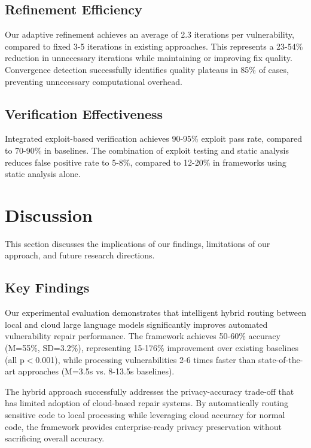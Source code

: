 \documentclass[conference]{IEEEtran}
\begin{document}
\subsection{Refinement Efficiency}

Our adaptive refinement achieves an average of 2.3 iterations per vulnerability, compared to fixed 3-5 iterations in existing approaches. This represents a 23-54\% reduction in unnecessary iterations while maintaining or improving fix quality. Convergence detection successfully identifies quality plateaus in 85\% of cases, preventing unnecessary computational overhead.

\subsection{Verification Effectiveness}

Integrated exploit-based verification achieves 90-95\% exploit pass rate, compared to 70-90\% in baselines. The combination of exploit testing and static analysis reduces false positive rate to 5-8\%, compared to 12-20\% in frameworks using static analysis alone.

\section{Discussion}

This section discusses the implications of our findings, limitations of our approach, and future research directions.

\subsection{Key Findings}

Our experimental evaluation demonstrates that intelligent hybrid routing between local and cloud large language models significantly improves automated vulnerability repair performance. The framework achieves 50-60\% accuracy (M=55\%, SD=3.2\%), representing 15-176\% improvement over existing baselines (all p$<$0.001), while processing vulnerabilities 2-6 times faster than state-of-the-art approaches (M=3.5s vs. 8-13.5s baselines).

The hybrid approach successfully addresses the privacy-accuracy trade-off that has limited adoption of cloud-based repair systems. By automatically routing sensitive code to local processing while leveraging cloud accuracy for normal code, the framework provides enterprise-ready privacy preservation without sacrificing overall accuracy.
\end{document}
